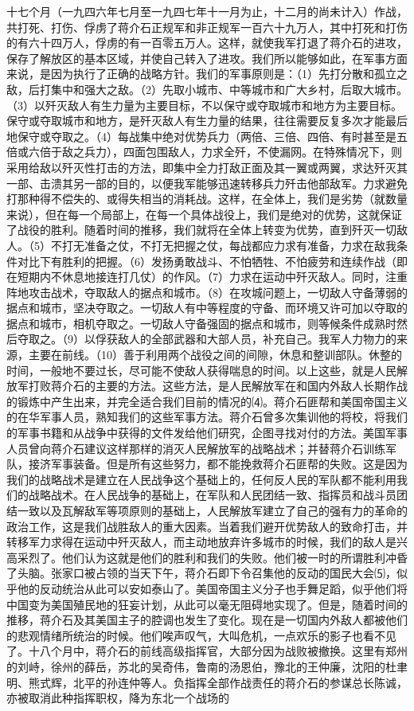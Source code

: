 \documentclass[UTF-8, a5paper, 12pt]{ctexart}
\begin{document}
十七个月（一九四六年七月至一九四七年十一月为止，十二月的尚未计入）作战，共打死、打伤、俘虏了蒋介石正规军和非正规军一百六十九万人，其中打死和打伤的有六十四万人，俘虏的有一百零五万人。这样，就使我军打退了蒋介石的进攻，保存了解放区的基本区域，并使自己转入了进攻。我们所以能够如此，在军事方面来说，是因为执行了正确的战略方针。我们的军事原则是：（1）先打分散和孤立之敌，后打集中和强大之敌。（2）先取小城市、中等城市和广大乡村，后取大城市。（3）以歼灭敌人有生力量为主要目标，不以保守或夺取城市和地方为主要目标。保守或夺取城市和地方，是歼灭敌人有生力量的结果，往往需要反复多次才能最后地保守或夺取之。（4）每战集中绝对优势兵力（两倍、三倍、四倍、有时甚至是五倍或六倍于敌之兵力），四面包围敌人，力求全歼，不使漏网。在特殊情况下，则采用给敌以歼灭性打击的方法，即集中全力打敌正面及其一翼或两翼，求达歼灭其一部、击溃其另一部的目的，以便我军能够迅速转移兵力歼击他部敌军。力求避免打那种得不偿失的、或得失相当的消耗战。这样，在全体上，我们是劣势（就数量来说），但在每一个局部上，在每一个具体战役上，我们是绝对的优势，这就保证了战役的胜利。随着时间的推移，我们就将在全体上转变为优势，直到歼灭一切敌人。（5）不打无准备之仗，不打无把握之仗，每战都应力求有准备，力求在敌我条件对比下有胜利的把握。（6）发扬勇敢战斗、不怕牺牲、不怕疲劳和连续作战（即在短期内不休息地接连打几仗）的作风。（7）力求在运动中歼灭敌人。同时，注重阵地攻击战术，夺取敌人的据点和城市。（8）在攻城问题上，一切敌人守备薄弱的据点和城市，坚决夺取之。一切敌人有中等程度的守备、而环境又许可加以夺取的据点和城市，相机夺取之。一切敌人守备强固的据点和城市，则等候条件成熟时然后夺取之。（9）以俘获敌人的全部武器和大部人员，补充自己。我军人力物力的来源，主要在前线。（10）善于利用两个战役之间的间隙，休息和整训部队。休整的时间，一般地不要过长，尽可能不使敌人获得喘息的时间。以上这些，就是人民解放军打败蒋介石的主要的方法。这些方法，是人民解放军在和国内外敌人长期作战的锻炼中产生出来，并完全适合我们目前的情况的⑷。蒋介石匪帮和美国帝国主义的在华军事人员，熟知我们的这些军事方法。蒋介石曾多次集训他的将校，将我们的军事书籍和从战争中获得的文件发给他们研究，企图寻找对付的方法。美国军事人员曾向蒋介石建议这样那样的消灭人民解放军的战略战术；并替蒋介石训练军队，接济军事装备。但是所有这些努力，都不能挽救蒋介石匪帮的失败。这是因为我们的战略战术是建立在人民战争这个基础上的，任何反人民的军队都不能利用我们的战略战术。在人民战争的基础上，在军队和人民团结一致、指挥员和战斗员团结一致以及瓦解敌军等项原则的基础上，人民解放军建立了自己的强有力的革命的政治工作，这是我们战胜敌人的重大因素。当着我们避开优势敌人的致命打击，并转移军力求得在运动中歼灭敌人，而主动地放弃许多城市的时候，我们的敌人是兴高采烈了。他们认为这就是他们的胜利和我们的失败。他们被一时的所谓胜利冲昏了头脑。张家口被占领的当天下午，蒋介石即下令召集他的反动的国民大会⑸，似乎他的反动统治从此可以安如泰山了。美国帝国主义分子也手舞足蹈，似乎他们将中国变为美国殖民地的狂妄计划，从此可以毫无阻碍地实现了。但是，随着时间的推移，蒋介石及其美国主子的腔调也发生了变化。现在是一切国内外敌人都被他们的悲观情绪所统治的时候。他们唉声叹气，大叫危机，一点欢乐的影子也看不见了。十八个月中，蒋介石的前线高级指挥官，大部分因为战败被撤换。这里有郑州的刘峙，徐州的薛岳，苏北的吴奇伟，鲁南的汤恩伯，豫北的王仲廉，沈阳的杜聿明、熊式辉，北平的孙连仲等人。负指挥全部作战责任的蒋介石的参谋总长陈诚，亦被取消此种指挥职权，降为东北一个战场的
\end{document}
